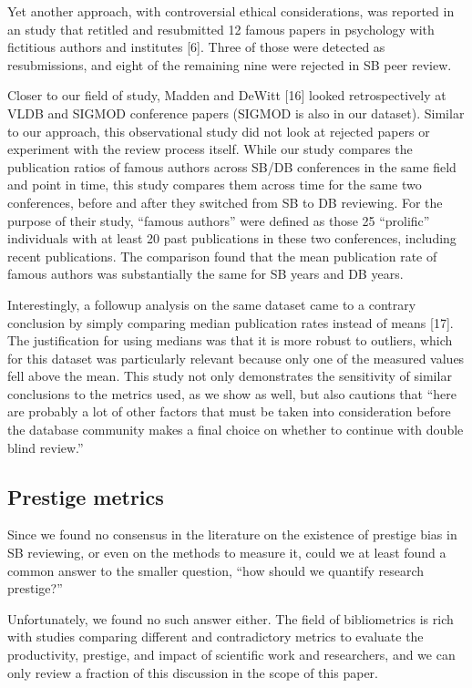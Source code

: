 \documentclass[12pt]{article}
\begin{document}
Yet another approach, with controversial ethical considerations, was reported in an study that retitled and resubmitted 12 famous papers in psychology with fictitious authors and institutes {[}6{]}.
Three of those were detected as resubmissions, and eight of the remaining nine were rejected in SB peer review.

Closer to our field of study, Madden and DeWitt {[}16{]} looked retrospectively at VLDB and SIGMOD conference papers (SIGMOD is also in our dataset).
Similar to our approach, this observational study did not look at rejected papers or experiment with the review process itself.
While our study compares the publication ratios of famous authors across SB/DB conferences in the same field and point in time, this study compares them across time for the same two conferences, before and after they switched from SB to DB reviewing.
For the purpose of their study, ``famous authors'' were defined as those 25 ``prolific'' individuals with at least 20 past publications in these two conferences, including recent publications.
The comparison found that the mean publication rate of famous authors was substantially the same for SB years and DB years.

Interestingly, a followup analysis on the same dataset came to a contrary conclusion by simply comparing median publication rates instead of means {[}17{]}.
The justification for using medians was that it is more robust to outliers, which for this dataset was particularly relevant because only one of the measured values fell above the mean.
This study not only demonstrates the sensitivity of similar conclusions to the metrics used, as we show as well, but also cautions that ``here are probably a lot of other factors that must be taken into consideration before the database community makes a final choice on whether to continue with double blind review.''

\hypertarget{prestige-metrics}{%
\subsection{Prestige metrics}\label{prestige-metrics}}

Since we found no consensus in the literature on the existence of prestige bias in SB reviewing, or even on the methods to measure it, could we at least found a common answer to the smaller question, ``how should we quantify research prestige?''

Unfortunately, we found no such answer either.
The field of bibliometrics is rich with studies comparing different and contradictory metrics to evaluate the productivity, prestige, and impact of scientific work and researchers, and we can only review a fraction of this discussion in the scope of this paper.
\end{document}
